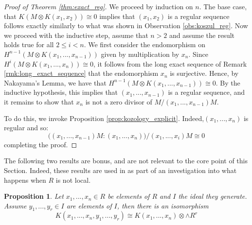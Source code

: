 \documentclass[12pt]{article}
\theoremstyle{plain}
\newtheorem{proposition}[thm]{Proposition}
\theoremstyle{definition}
\begin{document}
	\begin{proof}[Proof of Theorem \ref{thm:exact_reg}]
		We proceed by induction on $n$. The base case, that $K(M \otimes K(x_1,x_2)) \cong 0$ implies that $(x_1,x_2)$ is a regular sequence follows exactly similarly to what was shown in Observation \ref{obs:koszul_reg}. Now we proceed with the inductive step, assume that $n >2$ and assume the result holds true for all $2 \leq i < n$. We first consider the endomorphism on $H^{n-1}(M \otimes K(x_1,...,x_{n-1}))$ given by multiplication by $x_n$. Since $H^i(M \otimes K(x_1,...,x_n)) \cong 0$, it follows from the long exact sequence of Remark \ref{rmk:long_exact_sequence} that the endomorphism $x_n$ is surjective. Hence, by Nakayama's Lemma, we have that $H^{n-1}(M \otimes K(x_1,...,x_{n-1})) \cong 0$. By the inductive hypothesis, this implies that $(x_1,...,x_{n-1})$ is a regular sequence, and it remains to show that $x_n$ is not a zero divisor of $M/(x_1,...,x_{n-1})M$.
		
		To do this, we invoke Proposition \ref{prop:kozology_explicit}. Indeed,$(x_1,...,x_n)$ is regular and so:
		\begin{equation}
			\big((x_1,...,x_{n-1})M:(x_1,...,x_n)\big)/(x_1,...,x_i)M \cong 0
		\end{equation}
		completing the proof.
	\end{proof}
	The following two results are bonus, and are not relevant to the core point of this Section. Indeed, these results are used in \cite[\S17.3]{view} as part of an investigation into what happens when $R$ is not local.
	\begin{proposition}\label{prop:in_gen_ideal}
		Let $x_1,...,x_n \in R$ be elements of $R$ and $I$ the ideal they generate. Assume $y_1,...,y_r \in I$ are elements of $I$, then there is an isomorphism
		\begin{equation}
			K(x_1,...,x_n,y_1,...,y_r) \cong K(x_1,...,x_n) \otimes \wedge R^r
		\end{equation}
	\end{proposition}
\end{document}
